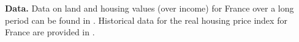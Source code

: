 \documentclass[./20250130-paper.tex]{subfiles}
\begin{document}
\textbf{Data.} Data on land and housing values (over income) for France over a long period can be found in \cite{piketty2014capital}. Historical data for the real housing price index for France are provided in \cite{knoll2017no}. 










\end{document}
